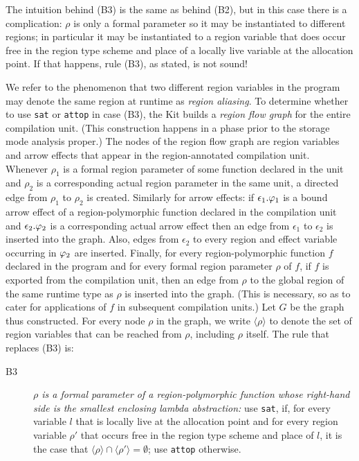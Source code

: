 \documentclass[12pt]{book}
\begin{document}
The intuition behind (B3) is the same as behind (B2), but
in this case there is a complication: 
$\rho$ is only a formal parameter so it may
be instantiated to different regions; 
in particular it may be instantiated to 
a region variable that does occur free in the region type scheme and place of a
locally live variable at the allocation point. If that happens, 
rule (B3), as stated, is not sound!

We refer to the phenomenon that two different region variables in the
program may denote the same region at runtime as 
%
{\em region aliasing}. To determine whether to use {\tt sat}
or {\tt attop} in case (B3), the Kit builds a 
%
\label{region flow graph}%
{\em region flow graph\/} for the entire compilation unit. (This
construction happens in a phase prior to the storage mode analysis
proper.)  The nodes of the region flow graph are region variables and
arrow effects that appear in the region-annotated compilation unit.
Whenever $\rho_1$ is a formal region parameter of some function
declared in the unit and $\rho_2$ is a corresponding actual region
parameter in the same unit, a directed edge from $\rho_1$ to $\rho_2$
is created. Similarly for arrow effects: if $\epsilon_1.\varphi_1$ is a
bound arrow effect of a region-polymorphic function declared in the
compilation unit and $\epsilon_2.\varphi_2$ is a corresponding actual
arrow effect then an edge from $\epsilon_1$ to $\epsilon_2$ is
inserted into the graph.  Also, edges from $\epsilon_2$ to every
region and effect variable occurring in $\varphi_2$ are inserted.
Finally, for every region-polymorphic function $f$ declared in the
program and for every formal region parameter $\rho$ of $f$, if $f$ is
exported from the compilation unit, then an edge from $\rho$ to the
global region of the same runtime type as $\rho$ is inserted into the
graph. (This is necessary, so as to cater for applications of $f$ in
subsequent compilation units.)  Let $G$ be the graph thus constructed.
For every node $\rho$ in the graph, we write $\langle\rho\rangle$ to
denote the set of region variables that can be reached from $\rho$,
including $\rho$ itself. The rule that replaces (B3) is:
%
\begin{description}
\item[B3]{\it $\rho$ is a formal parameter of a region-polymorphic function
      whose right-hand side is the smallest enclosing lambda abstraction:}
      use {\tt sat}, if, for every variable $l$ that is locally live 
      at the allocation point and for every region variable $\rho'$
      that occurs free in the region type scheme and place of $l$, it
      is the case that $\langle\rho\rangle\cap\langle\rho'\rangle =\emptyset$;
      use {\tt attop} otherwise.
\end{description}
\medskip
\end{document}
